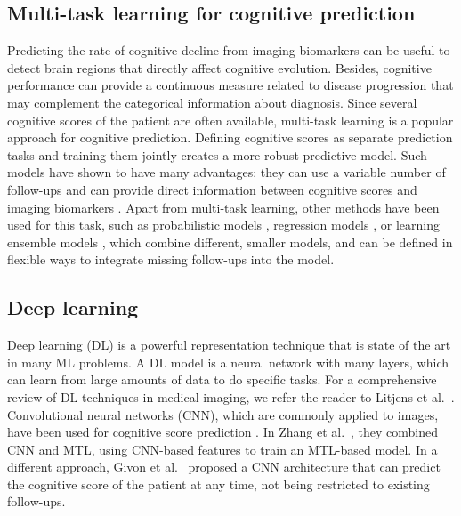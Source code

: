 \subsection{Multi-task learning for cognitive prediction}

Predicting the rate of cognitive decline from imaging biomarkers can be useful to detect brain regions that directly affect cognitive evolution. Besides, cognitive performance can provide a continuous measure related to disease progression that may complement the categorical information about diagnosis. Since several cognitive scores of the patient are often available, multi-task learning is a popular approach for cognitive prediction. Defining cognitive scores as separate prediction tasks and training them jointly creates a more robust predictive model. Such models have shown to have many advantages: they can use a variable number of follow-ups \cite{Lei2017,Zhou2013a,Aksman2019} and can provide direct information between cognitive scores and imaging biomarkers \cite{Jie2017,Lei2017,Wang2012b,Wang2016,Zhang2012a}. Apart from multi-task learning, other methods have been used for this task, such as probabilistic models \cite{Zhu2018}, regression models \cite{AraqueCaballero2017}, or learning ensemble models \cite{Chi2017,Huang2016c,Yang2018a}, which combine different, smaller models, and can be defined in flexible ways to integrate missing follow-ups into the model. \\

\subsection{Deep learning}

Deep learning (DL) is a powerful representation technique that is state of the art in many ML problems. A DL model is a neural network with many layers, which can learn from large amounts of data to do specific tasks. For a comprehensive review of DL techniques in medical imaging, we refer the reader to Litjens et al.\ \cite{Litjens2017}. \\

Convolutional neural networks (CNN), which are commonly applied to images, have been used for cognitive score prediction \cite{Givon2017,Zhang2017}. In Zhang et al.\ \cite{Zhang2017}, they combined CNN and MTL, using CNN-based features to train an MTL-based model. In a different approach, Givon et al.\ \cite{Givon2017} proposed a CNN architecture that can predict the cognitive score of the patient at any time, not being restricted to existing follow-ups. \\


